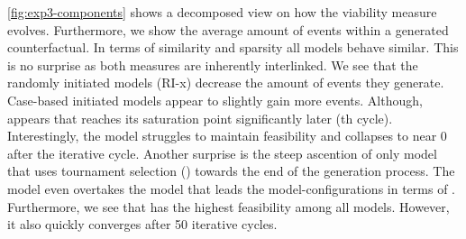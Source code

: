 \documentclass[./../../paper.tex]{subfiles}
\begin{document}
\autoref{fig:exp3-components} shows a decomposed view on how the viability measure evolves. Furthermore, we show the average amount of events within a generated counterfactual. 
In terms of similarity and sparsity all models behave similar. This is no surprise as both measures are inherently interlinked. 
We see that the randomly initiated models (RI-x) decrease the amount of events they generate. 
Case-based initiated models appear to slightly gain more events. Although,   appears that reaches its saturation point significantly later (th cycle).
Interestingly, the  model struggles to maintain feasibility and collapses to near 0 after the  iterative cycle. 
Another surprise is the steep ascention of only model that uses tournament selection () towards the end of the generation process. The  model even overtakes the model that leads the model-configurations in terms of . 
Furthermore, we see that  has the highest feasibility among all models. However, it also quickly converges after 50 iterative cycles.    
   



\end{document}
